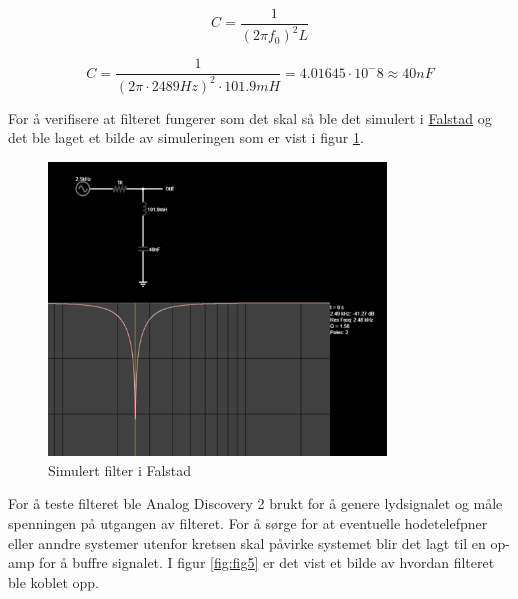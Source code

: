 \begin{equation}
	C = \frac{1}{(2\pi f_0)^2 L}
	\label{eq:2}
\end{equation}

\begin{equation}
	C = \frac{1}{(2\pi \cdot 2489Hz)^2 \cdot 101.9mH} = 4.01645 \cdot 10^-8 \approx 40nF
	\label{eq:3}
\end{equation}

For å verifisere at filteret fungerer som det skal så ble det simulert i \href{https://www.falstad.com/afilter/circuitjs.html?cct=$+1+0.000005+5+50+5+40%0A%25+0+28853.998118144256%0Al+912+208+912+304+0+0.1018+0%0Ac+912+304+912+400+0+4e-8+0%0Ar+800+208+912+208+0+1000%0AO+912+208+976+208+0%0Ag+912+400+912+432+0%0A170+800+208+768+208+3+20+60+5+0.5%0Ao+5+64+0+34+5+0.00009765625+0+-1+in%0Ao+3+64+0+34+5+0.00009765625+1+-1+out%0Ao+0+64+0+34+10+0.025+2+-1+inductor%0Ao+1+64+0+34+10+0.025+2+-1+cap%0A}{Falstad} og det ble laget et bilde av simuleringen som er vist i figur \ref{fig:fig4}.

\begin{figure}[!h]
	\centering
	\includegraphics[width=0.8\textwidth]{Bilder/Falstad_filters.png}
	\caption{Simulert filter i Falstad}
	\label{fig:fig4}
\end{figure}


For å teste filteret ble Analog Discovery 2 brukt for å genere lydsignalet og måle spenningen på utgangen av filteret. For å sørge for at eventuelle hodetelefpner eller anndre systemer utenfor kretsen skal påvirke systemet blir det lagt til en op-amp for å buffre signalet. I figur \ref{fig:fig5} er det vist et bilde av hvordan filteret ble koblet opp.

